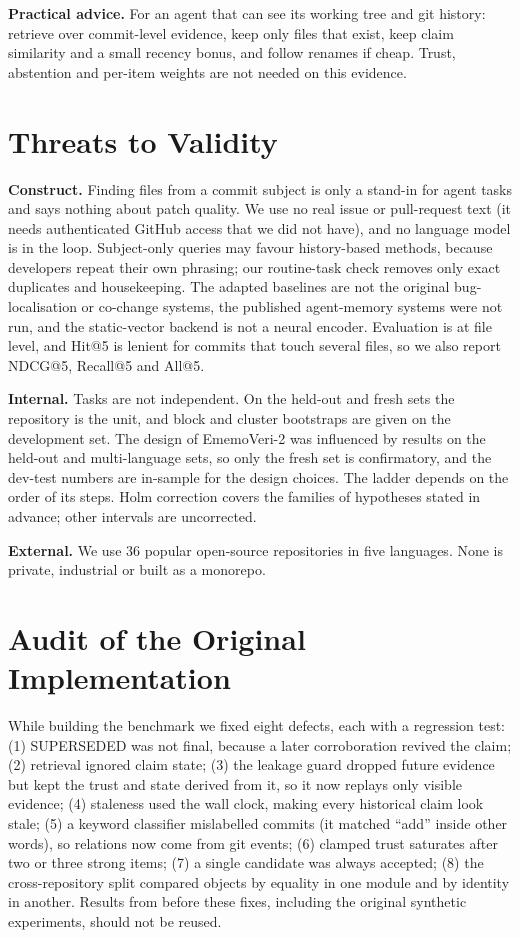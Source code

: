 \documentclass[runningheads]{llncs}
\newcommand{\sys}{EmemoVeri}
\begin{document}
\textbf{Practical advice.} For an agent that can see its working tree and git history: retrieve over commit-level evidence, keep only files that exist, keep claim similarity and a small recency bonus, and follow renames if cheap. Trust, abstention and per-item weights are not needed on this evidence.

\section{Threats to Validity}
\label{sec:threats}
\textbf{Construct.} Finding files from a commit subject is only a stand-in for agent tasks and says nothing about patch quality. We use no real issue or pull-request text (it needs authenticated GitHub access that we did not have), and no language model is in the loop. Subject-only queries may favour history-based methods, because developers repeat their own phrasing; our routine-task check removes only exact duplicates and housekeeping. The adapted baselines are not the original bug-localisation or co-change systems, the published agent-memory systems were not run, and the static-vector backend is not a neural encoder. Evaluation is at file level, and Hit@5 is lenient for commits that touch several files, so we also report NDCG@5, Recall@5 and All@5.

\textbf{Internal.} Tasks are not independent. On the held-out and fresh sets the repository is the unit, and block and cluster bootstraps are given on the development set. The design of \sys{}-2 was influenced by results on the held-out and multi-language sets, so only the fresh set is confirmatory, and the dev-test numbers are in-sample for the design choices. The ladder depends on the order of its steps. Holm correction covers the families of hypotheses stated in advance; other intervals are uncorrected.

\textbf{External.} We use 36 popular open-source repositories in five languages. None is private, industrial or built as a monorepo.

\section{Audit of the Original Implementation}
\label{sec:audit}
While building the benchmark we fixed eight defects, each with a regression test: (1) SUPERSEDED was not final, because a later corroboration revived the claim; (2) retrieval ignored claim state; (3) the leakage guard dropped future evidence but kept the trust and state derived from it, so it now replays only visible evidence; (4) staleness used the wall clock, making every historical claim look stale; (5) a keyword classifier mislabelled commits (it matched ``add'' inside other words), so relations now come from git events; (6) clamped trust saturates after two or three strong items; (7) a single candidate was always accepted; (8) the cross-repository split compared objects by equality in one module and by identity in another. Results from before these fixes, including the original synthetic experiments, should not be reused.
\end{document}
